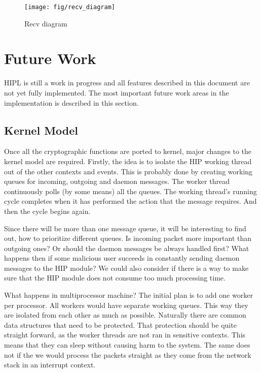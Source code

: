\begin{figure}[htb]
\begin{center}
\texttt{[image: fig/recv\_diagram]}
\end{center}
\caption{Recv diagram}
\label{fig:recv_diagram}
\end{figure}

\section{Future Work}
\label{sec:future_work}

\ac{HIPL} is still a work in progress and all features described in
this document are not yet fully implemented. The most important future
work areas in the implementation is described in this section.

\subsection{Kernel Model}
\label{sec:kernel_model_future_work}

Once all the cryptographic functions are ported to kernel, major
changes to the kernel model are required. Firstly, the idea is to
isolate the \ac{HIP} working thread out of the other contexts and
events. This is probably done by creating working queues for incoming,
outgoing and daemon messages.  The worker thread continuously polls
(by some means) all the queues.  The working thread's running cycle
completes when it has performed the action that the message
requires. And then the cycle begins again.

Since there will be more than one message queue, it will be
interesting to find out, how to prioritize different queues. Is
incoming packet more important than outgoing ones? Or should the
daemon messages be always handled first? What happens then if some
malicious user succeeds in constantly sending daemon messages to the
\ac{HIP} module?  We could also consider if there is a way to make
sure that the \ac{HIP} module does not consume too much processing
time.

What happens in multiprocessor machine? The initial plan is to add one
worker per processor. All workers would have separate working queues.
This way they are isolated from each other as much as possible.
Naturally there are common data structures that need to be protected.
That protection should be quite straight forward, as the worker
threads are not ran in sensitive contexts. This means that they can
sleep without causing harm to the system. The same does not if the we
would process the packets straight as they come from the network stack
in an interrupt context.

